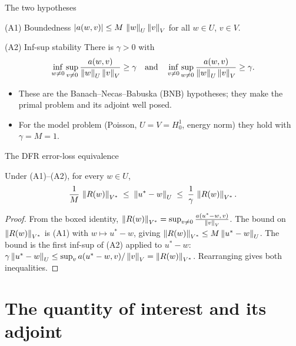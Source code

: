 \documentclass[11pt,aspectratio=169]{beamer}
\begin{document}
\begin{frame}{The two hypotheses}
  \begin{block}{(A1) Boundedness}
    $|a(w,v)| \le M\,\left\|w\right\|_U \left\|v\right\|_V$ for all $w \in U$, $v \in V$.
  \end{block}
  \begin{block}{(A2) Inf-sup stability}
    There is $\gamma > 0$ with
    \[
      \inf_{w \ne 0}\sup_{v \ne 0} \frac{a(w,v)}{\left\|w\right\|_U\left\|v\right\|_V} \ge \gamma
      \quad\text{and}\quad
      \inf_{v \ne 0}\sup_{w \ne 0} \frac{a(w,v)}{\left\|w\right\|_U\left\|v\right\|_V} \ge \gamma .
    \]
  \end{block}
  \medskip
  \begin{itemize}\itemsep0.4em
    \item These are the Banach--Necas--Babuska (BNB) hypotheses; they make the
          primal problem and its adjoint well posed.
    \item For the model problem (Poisson, $U = V = H^1_0$, energy norm) they hold
          with $\gamma = M = 1$.
  \end{itemize}
\end{frame}

\begin{frame}{The DFR error-loss equivalence}
  \begin{theorem}
    Under (A1)--(A2), for every $w \in U$,
    \[
      \frac{1}{M}\,\left\|R(w)\right\|_{V^*}
        \;\le\; \left\|u^* - w\right\|_U
        \;\le\; \frac{1}{\gamma}\,\left\|R(w)\right\|_{V^*} .
    \]
  \end{theorem}
  \begin{proof}
    From the boxed identity, $\left\|R(w)\right\|_{V^*} = \sup_{v \ne 0}
    \frac{a(u^*-w,\,v)}{\left\|v\right\|_V}$. The  bound on
    $\left\|R(w)\right\|_{V^*}$ is (A1) with $w \mapsto u^*-w$, giving
    $\left\|R(w)\right\|_{V^*} \le M\left\|u^*-w\right\|_U$. The  bound is the
    first inf-sup of (A2) applied to $u^*-w$:
    $\gamma\left\|u^*-w\right\|_U \le \sup_v a(u^*-w,v)/\left\|v\right\|_V = \left\|R(w)\right\|_{V^*}$.
    Rearranging gives both inequalities. \qedhere
  \end{proof}
\end{frame}

\section{The quantity of interest and its adjoint}
\end{document}
